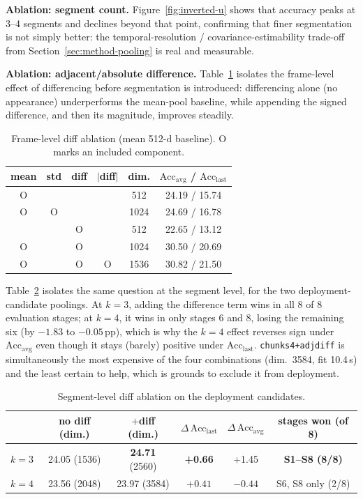 \documentclass[11pt]{article}
\begin{document}
\textbf{Ablation: segment count.} Figure~\ref{fig:inverted-u} shows that
accuracy peaks at 3--4 segments and declines beyond that point, confirming
that finer segmentation is not simply better: the temporal-resolution /
covariance-estimability trade-off from Section~\ref{sec:method-pooling}
is real and measurable.

\textbf{Ablation: adjacent/absolute difference.} Table~\ref{tab:diff-frame}
isolates the frame-level effect of differencing before segmentation is
introduced: differencing alone (no appearance) underperforms the mean-pool
baseline, while appending the signed difference, and then its magnitude,
improves steadily.

\begin{table}[h]
\centering
\caption{Frame-level diff ablation (mean 512-d baseline). O marks an
included component.}
\label{tab:diff-frame}
\small
\begin{tabular}{@{}cccccc@{}}
\toprule
mean & std & diff & $|$diff$|$ & dim. & $\mathrm{Acc}_{\mathrm{avg}}$ / $\mathrm{Acc}_{\mathrm{last}}$ \\
\midrule
O & & & & 512 & 24.19 / 15.74 \\
O & O & & & 1024 & 24.69 / 16.78 \\
 & & O & & 512 & 22.65 / 13.12 \\
O & & O & & 1024 & 30.50 / 20.69 \\
O & & O & O & 1536 & 30.82 / 21.50 \\
\bottomrule
\end{tabular}
\end{table}

Table~\ref{tab:diff-segment} isolates the same question at the segment
level, for the two deployment-candidate poolings. At $k{=}3$, adding the
difference term wins in all 8 of 8 evaluation stages; at $k{=}4$, it wins
in only stages 6 and 8, losing the remaining six (by
$-1.83$ to $-0.05$\,pp), which is why the $k{=}4$ effect reverses sign
under $\mathrm{Acc}_{\mathrm{avg}}$ even though it stays (barely) positive
under $\mathrm{Acc}_{\mathrm{last}}$. \texttt{chunks4+adjdiff} is
simultaneously the most expensive of the four combinations (dim.\ 3584, fit
10.4\,s) and the least certain to help, which is grounds to exclude it from
deployment.

\begin{table}[h]
\centering
\caption{Segment-level diff ablation on the deployment candidates.}
\label{tab:diff-segment}
\small
\begin{tabular}{@{}lccccc@{}}
\toprule
& no diff (dim.) & $+$diff (dim.) & $\Delta\,\mathrm{Acc}_{\mathrm{last}}$ & $\Delta\,\mathrm{Acc}_{\mathrm{avg}}$ & stages won (of 8) \\
\midrule
$k{=}3$ & 24.05 (1536) & \textbf{24.71} (2560) & \textbf{+0.66} & +1.45 & \textbf{S1--S8 (8/8)} \\
$k{=}4$ & 23.56 (2048) & 23.97 (3584) & $+0.41$ & \textbf{$-0.44$} & S6, S8 only (2/8) \\
\bottomrule
\end{tabular}
\end{table}
\end{document}
